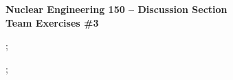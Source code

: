 \documentclass{report}
\begin{document}
\begin{center}
\textbf{\large Nuclear Engineering 150 -- Discussion Section}\\ 
\textbf{Team Exercises \#3}
\end{center}

;
\newpage

;
\end{document}
